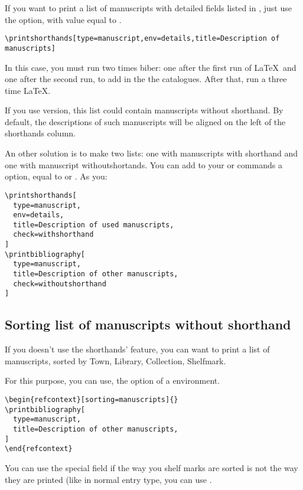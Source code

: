 \documentclass{ltxdockit}[2011/03/25]
\begin{document}
If you want to print a list of manuscripts with detailed fields listed in , just use the  option, with value equal to
.

\begin{verbatim}
\printshorthands[type=manuscript,env=details,title=Description of manuscripts]
\end{verbatim}

In this case, you must run two times biber: one after the first run of \LaTeX\ and one after the second run, to add in the  the catalogues. After that, run a three time \LaTeX.

If you use  version, this list could contain manuscripts without shorthand. By default, the descriptions of such manuscripts will be aligned on the left of the shorthands column. 

\label{bibcheck}An other solution is to make two lists: one with manuscripts with shorthand and one with manuscript withoutshortands. You can add to your  or   commands a  option, equal to  or . As you:
\begin{verbatim}
\printshorthands[
  type=manuscript,
  env=details,
  title=Description of used manuscripts,
  check=withshorthand
]
\printbibliography[
  type=manuscript,
  title=Description of other manuscripts,
  check=withoutshorthand
]
\end{verbatim}

\subsection{Sorting list of manuscripts without shorthand}

\label{sorting} If you doesn't use the shorthands' feature, you can want to print a list of manuscripts, sorted by Town, Library, Collection, Shelfmark.

For this purpose, you can use, the option  of a  environment. 

\begin{verbatim}
\begin{refcontext}[sorting=manuscripts]{}
\printbibliography[
  type=manuscript,
  title=Description of other manuscripts,
]
\end{refcontext}
\end{verbatim}

You can use the special field  if the way you shelf marks are sorted is not the way they are printed (like in normal entry type, you can use .
\end{document}
